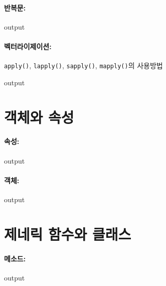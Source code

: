\documentclass{book}
\begin{document}
\paragraph{반복문:}
\begin{Schunk}
\begin{Soutput}
output
\end{Soutput}
\end{Schunk}

\paragraph{벡터라이제이션:} \texttt{apply()}, \texttt{lapply()}, \texttt{sapply()}, \texttt{mapply()}의 사용방법
\begin{Schunk}
\begin{Soutput}
output
\end{Soutput}
\end{Schunk}


\section{객체와 속성}
\paragraph{속성:}

\begin{Schunk}
\begin{Soutput}
output
\end{Soutput}
\end{Schunk}

\paragraph{객체:}

\begin{Schunk}
\begin{Soutput}
output
\end{Soutput}
\end{Schunk}

\section{제네릭 함수와 클래스}
\paragraph{메소드:}
\begin{Schunk}
\begin{Soutput}
output
\end{Soutput}
\end{Schunk}
\end{document}
